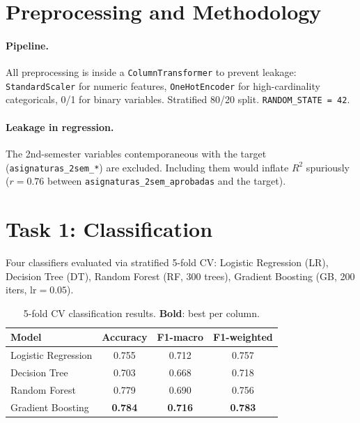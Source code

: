 \documentclass{article}
\begin{document}
\section{Preprocessing and Methodology}

\paragraph{Pipeline.} All preprocessing is inside a \texttt{ColumnTransformer} to prevent leakage: \texttt{StandardScaler} for numeric features, \texttt{OneHotEncoder} for high-cardinality categoricals, 0/1 for binary variables. Stratified 80/20 split. \texttt{RANDOM\_STATE = 42}.

\paragraph{Leakage in regression.} The 2nd-semester variables contemporaneous with the target (\texttt{asignaturas\_2sem\_*}) are excluded. Including them would inflate $R^2$ spuriously ($r=0.76$ between \texttt{asignaturas\_2sem\_aprobadas} and the target).

\section{Task 1: Classification}

Four classifiers evaluated via stratified 5-fold CV: Logistic Regression (LR), Decision Tree (DT), Random Forest (RF, 300 trees), Gradient Boosting (GB, 200 iters, lr$=0.05$).

\begin{table}[h]
\centering
\caption{5-fold CV classification results. \textbf{Bold}: best per column.}
\label{tab:classification}
\vspace{0.3em}
\begin{tabular}{lccc}
\toprule
\textbf{Model} & \textbf{Accuracy} & \textbf{F1-macro} & \textbf{F1-weighted} \\
\midrule
Logistic Regression & 0.755 & 0.712 & 0.757 \\
Decision Tree       & 0.703 & 0.668 & 0.718 \\
Random Forest       & 0.779 & 0.690 & 0.756 \\
Gradient Boosting   & \textbf{0.784} & \textbf{0.716} & \textbf{0.783} \\
\bottomrule
\end{tabular}
\end{table}
\end{document}
